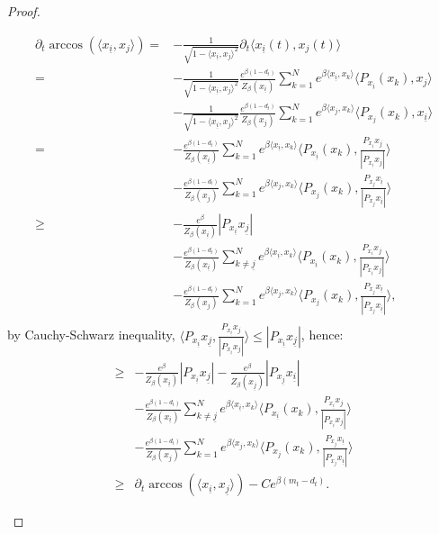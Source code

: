 \documentclass{article}
\numberwithin{theorem}{section}
\begin{document}
\begin{proof}
\begin{itemize}
\begin{align*}
\partial_t \arccos(\langle x_{\underline{i}}, x_j\rangle) =& -\frac{1}{\sqrt{1-\langle x_{\underline{i}}, x_j\rangle^2}}\partial_t \langle x_{\underline{i}}(t), x_j(t)\rangle\\
=&-\frac{1}{\sqrt{1-\langle x_{\underline{i}}, x_j\rangle^2}} \frac{e^{\beta(1-d_t)}}{Z_\beta(x_{\underline{i}})}\sum_{k=1}^N e^{\beta\langle x_{\underline{i}}, x_k\rangle}  \langle P_{x_{\underline{i}}}(x_k), x_j\rangle \\
&-\frac{1}{\sqrt{1-\langle x_{\underline{i}}, x_j\rangle^2}}\frac{e^{\beta(1-d_t)}}{Z_\beta(x_j)}\sum_{k=1}^N e^{\beta\langle x_j, x_k\rangle}  \langle P_{x_j}(x_k), x_{\underline{i}}\rangle\\
=&-\frac{e^{\beta(1-d_t)}}{Z_\beta(x_{\underline{i}})}\sum_{k=1}^N e^{\beta\langle x_{\underline{i}}, x_k\rangle}  \langle P_{x_{\underline{i}}}(x_k), \frac{P_{x_{\underline{i}}}x_j}{|P_{x_{\underline{i}}}x_j|}\rangle\\
&-\frac{e^{\beta(1-d_t)}}{Z_\beta(x_j)}\sum_{k=1}^N e^{\beta\langle x_j, x_k\rangle}  \langle P_{x_j}(x_k), \frac{P_{x_j}x_{\underline{i}}}{|P_{x_j}x_{\underline{i}}|}\rangle\\
\geq&-\frac{e^{\beta}}{Z_\beta(x_{\underline{i}})}  |P_{x_{\underline{i}}}x_{\underline{j}}|\\
&-\frac{e^{\beta(1-d_t)}}{Z_\beta(x_{\underline{i}})}\sum_{k\neq\underline{j}}^N e^{\beta\langle x_{\underline{i}}, x_k\rangle}  \langle P_{x_{\underline{i}}}(x_k), \frac{P_{x_{\underline{i}}}x_j}{|P_{x_{\underline{i}}}x_j|}\rangle \\
&- \frac{e^{\beta(1-d_t)}}{Z_\beta(x_j)}\sum_{k=1}^N e^{\beta\langle x_j, x_k\rangle}  \langle P_{x_j}(x_k), \frac{P_{x_j}x_{\underline{i}}}{|P_{x_j}x_{\underline{i}}|}\rangle,\\
\end{align*}
by Cauchy-Schwarz inequality,  $\langle P_{x_{\underline{i}}}x_{\underline{j}}, \frac{P_{x_{\underline{i}}}x_j}{|P_{x_{\underline{i}}}x_j|} \rangle\leq |P_{x_{\underline{i}}}x_{\underline{j}}|$, hence:
\begin{align*}
\geq&-\frac{e^{\beta}}{Z_\beta(x_{\underline{i}})}  |P_{x_{\underline{i}}}x_{\underline{j}}|-\frac{e^{\beta}}{Z_\beta(x_{\underline{j}})}  |P_{x_{\underline{j}}}x_{\underline{i}}|\\
&-\frac{e^{\beta(1-d_t)}}{Z_\beta(x_{\underline{i}})}\sum_{k\neq\underline{j}}^N e^{\beta\langle x_{\underline{i}}, x_k\rangle}  \langle P_{x_{\underline{i}}}(x_k), \frac{P_{x_{\underline{i}}}x_j}{|P_{x_{\underline{i}}}x_j|}\rangle \\
&-\frac{e^{\beta(1-d_t)}}{Z_\beta(x_j)}\sum_{k=1}^N e^{\beta\langle x_j, x_k\rangle}  \langle P_{x_j}(x_k), \frac{P_{x_j}x_{\underline{i}}}{|P_{x_j}x_{\underline{i}}|}\rangle\\
\geq& \partial_t \arccos(\langle x_{\underline{i}}, x_{\underline{j}}\rangle) -Ce^{\beta(m_t-d_t)}.
\end{align*}


\end{itemize}
\end{proof}
\end{document}
